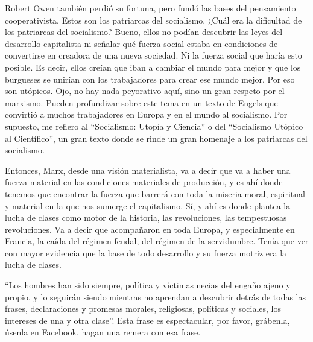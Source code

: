 \documentclass[
  jou,
  floatsintext,
  longtable,
  a4paper,
  nolmodern,
  notxfonts,
  notimes,
  colorlinks=true,linkcolor=blue,citecolor=blue,urlcolor=blue]{apa7}
\begin{document}
Robert Owen también perdió su fortuna, pero fundó las bases del
pensamiento cooperativista. Estos son los patriarcas del socialismo.
¿Cuál era la dificultad de los patriarcas del socialismo? Bueno, ellos
no podían descubrir las leyes del desarrollo capitalista ni señalar qué
fuerza social estaba en condiciones de convertirse en creadora de una
nueva sociedad. Ni la fuerza social que haría esto posible. Es decir,
ellos creían que iban a cambiar el mundo para mejor y que los burgueses
se unirían con los trabajadores para crear ese mundo mejor. Por eso son
utópicos. Ojo, no hay nada peyorativo aquí, sino un gran respeto por el
marxismo. Pueden profundizar sobre este tema en un texto de Engels que
convirtió a muchos trabajadores en Europa y en el mundo al socialismo.
Por supuesto, me refiero al ``Socialismo: Utopía y Ciencia'' o del
``Socialismo Utópico al Científico'', un gran texto donde se rinde un
gran homenaje a los patriarcas del socialismo.

Entonces, Marx, desde una visión materialista, va a decir que va a haber
una fuerza material en las condiciones materiales de producción, y es
ahí donde tenemos que encontrar la fuerza que barrerá con toda la
miseria moral, espiritual y material en la que nos sumerge el
capitalismo. Sí, y ahí es donde plantea la lucha de clases como motor de
la historia, las revoluciones, las tempestuosas revoluciones. Va a decir
que acompañaron en toda Europa, y especialmente en Francia, la caída del
régimen feudal, del régimen de la servidumbre. Tenía que ver con mayor
evidencia que la base de todo desarrollo y su fuerza motriz era la lucha
de clases.

``Los hombres han sido siempre, política y víctimas necias del engaño
ajeno y propio, y lo seguirán siendo mientras no aprendan a descubrir
detrás de todas las frases, declaraciones y promesas morales,
religiosas, políticas y sociales, los intereses de una y otra clase''.
Esta frase es espectacular, por favor, grábenla, úsenla en Facebook,
hagan una remera con esa frase.
\end{document}
